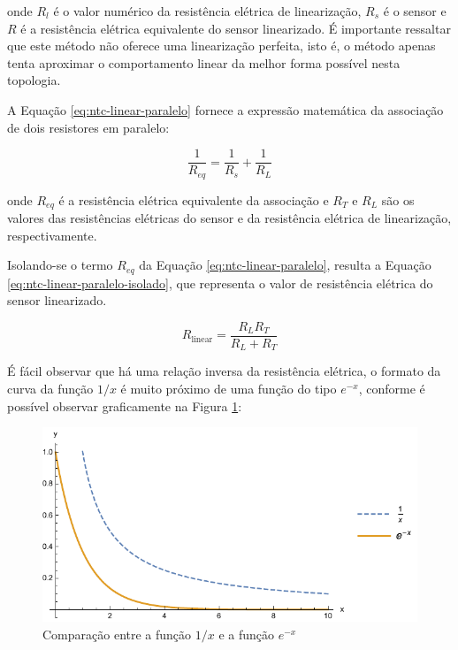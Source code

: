 \documentclass[a4paper]{instrumentacao}
\begin{document}
\noindent
onde $R_l$ é o valor numérico da resistência elétrica de linearização, $R_s$ é o sensor e $R$ é a resistência elétrica equivalente do sensor linearizado. É importante ressaltar que este método não oferece uma linearização perfeita, isto é, o método apenas tenta aproximar o comportamento linear da melhor forma possível nesta topologia.

A Equação \ref{eq:ntc-linear-paralelo} fornece a expressão matemática da associação de dois resistores em paralelo:

\begin{equation}
	\frac{1}{R_{eq}}=\frac{1}{R_s} + \frac{1}{R_L}
	\label{eq:ntc-linear-paralelo}
\end{equation}

\noindent
onde $R_{eq}$ é a resistência elétrica equivalente da associação e $R_T$ e $R_L$ são os valores das resistências elétricas do sensor e da resistência elétrica de linearização, respectivamente.

Isolando-se o termo $R_{eq}$ da Equação \ref{eq:ntc-linear-paralelo}, resulta a Equação \ref{eq:ntc-linear-paralelo-isolado}, que representa o valor de resistência elétrica do sensor linearizado.

\begin{equation}
	R_{\text{linear}} = \frac{R_L R_T}{R_L+R_T}
	\label{eq:ntc-linear-paralelo-isolado}
\end{equation}

É fácil observar que há uma relação inversa da resistência elétrica, o formato da curva da função $1/x$ é muito próximo de uma função do tipo $e^{-x}$, conforme é possível observar graficamente na Figura \ref{fig:ntc-linear-funcao-comparacao}:

\begin{figure}[H]
\center
\includegraphics[width=\textwidth]{X1-vs-Exponencial.pdf}
\caption{Comparação entre a função $1/x$ e a função $e^{-x}$}
\label{fig:ntc-linear-funcao-comparacao}
\end{figure}
\end{document}
